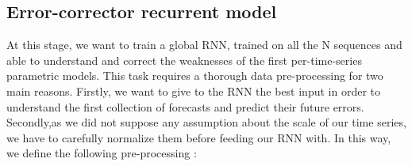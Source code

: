\documentclass{article} %
\newcommand{\ts}{y}
\newcommand{\fullts}{{\bf \ts}}
\newcommand{\tspred}{\hat{\ts}}
\newcommand{\stat}{f}
\newcommand{\statparam}{\theta_{predictor}}
\newcommand{\lag}{h}
\newcommand{\remainder}{r}
\newcommand{\hiddenregime}{U}
\begin{document}


\subsection{Error-corrector recurrent model}

At this stage, we want to train a global RNN, trained on all the N sequences and able to understand and correct the weaknesses of the first per-time-series parametric models. This task requires a thorough data pre-processing for two main reasons. Firstly, we want to give to the RNN the best input in order to understand the first collection of forecasts and predict their future errors. Secondly,as we did not suppose any assumption about the scale of our time series, we have to carefully normalize them before feeding our RNN with.
In this way, we define the following pre-processing :

\end{document}

